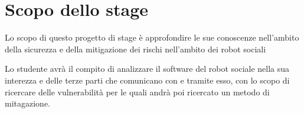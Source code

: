 \section*{Scopo dello stage}
Lo scopo di questo progetto di stage è approfondire le sue conoscenze nell'ambito della sicurezza e della mitigazione dei rischi nell'ambito dei robot sociali

Lo studente avrà il compito di analizzare il software del robot sociale nella sua interezza e delle terze parti che comunicano con e tramite esso, con lo scopo di ricercare delle vulnerabilità per le quali andrà poi ricercato un metodo di mitagazione.


